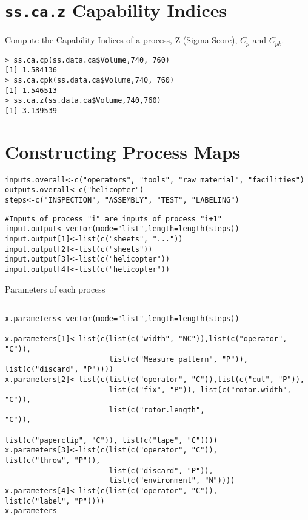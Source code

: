 \documentclass[11pt]{article} %
\begin{document}
\section{\texttt{ss.ca.z} Capability Indices}

Compute the Capability Indices of a process, Z (Sigma Score), $C_p$ and $C_{pk}$.
\begin{verbatim}
> ss.ca.cp(ss.data.ca$Volume,740, 760)
[1] 1.584136
> ss.ca.cpk(ss.data.ca$Volume,740, 760)
[1] 1.546513
> ss.ca.z(ss.data.ca$Volume,740,760)
[1] 3.139539
\end{verbatim}



\newpage
\section{Constructing Process Maps}
\begin{framed}
\begin{verbatim}
inputs.overall<-c("operators", "tools", "raw material", "facilities")
outputs.overall<-c("helicopter")
steps<-c("INSPECTION", "ASSEMBLY", "TEST", "LABELING")
\end{verbatim}
\end{framed}

\begin{framed}
\begin{verbatim}
#Inputs of process "i" are inputs of process "i+1"
input.output<-vector(mode="list",length=length(steps))
input.output[1]<-list(c("sheets", "..."))
input.output[2]<-list(c("sheets"))
input.output[3]<-list(c("helicopter"))
input.output[4]<-list(c("helicopter"))
\end{verbatim}
\end{framed}
Parameters of each process
\begin{framed}
\begin{verbatim}

x.parameters<-vector(mode="list",length=length(steps))

x.parameters[1]<-list(c(list(c("width", "NC")),list(c("operator", "C")),
                        list(c("Measure pattern", "P")), list(c("discard", "P"))))
x.parameters[2]<-list(c(list(c("operator", "C")),list(c("cut", "P")),
                        list(c("fix", "P")), list(c("rotor.width", "C")),
                        list(c("rotor.length",                                                                                "C")), 
                                                                                list(c("paperclip", "C")), list(c("tape", "C"))))
x.parameters[3]<-list(c(list(c("operator", "C")),
list(c("throw", "P")),
                        list(c("discard", "P")), 
                        list(c("environment", "N"))))
x.parameters[4]<-list(c(list(c("operator", "C")),
list(c("label", "P"))))
x.parameters

\end{verbatim}
\end{framed}
\end{document}

